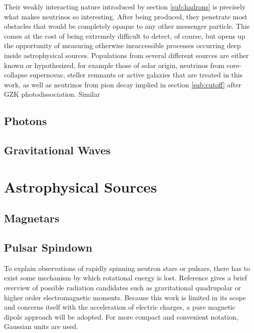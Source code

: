 Their weakly interacting nature introduced by section \ref{sub:hadrons} is precisely what makes neutrinos so interesting. After
being produced, they penetrate most obstacles that would be completely opaque to any other messenger particle. This comes at the
cost of being extremely difficult to detect, of course, but opens up the opportunity of measuring otherwise ineaccessible processes
occurring deep inside astrophysical sources. Populations from several different sources are either known or hypothesized, for example
those of solar origin, neutrinos from core-collapse supernovae, steller remnants or active galaxies that are treated in this work,
as well as neutrinos from pion decay implied in section \ref{sub:cutoff} after GZK photodissociation. Similar 




\subsection{Photons}
\label{sub:photons}



\subsection{Gravitational Waves}
\label{sub:gravitational}



\section{Astrophysical Sources}
\label{sec:sources}



\subsection{Magnetars}
\label{sub:magnetars}



\subsection{Pulsar Spindown}
\label{sub:spindown}

To explain observations of rapidly spinning neutron stars or pulsars, there has to exist some mechanism by which rotational energy is
lost. Reference \cite{Alvarez_2004} gives a brief overview of possible radiation candidates such as gravitational quadrupolar or
higher order electromagnetic moments. Because this work is limited in its scope and concerns itself with the acceleration of
electric charges, a pure magnetic dipole approach will be adopted. For more compact and convenient notation, Gaussian units are used.

